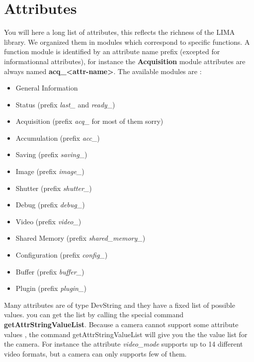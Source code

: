 \documentclass[letterpaper,10pt,english]{sphinxmanual}
\begin{document}
\section{Attributes}
\label{LimaDetector/limadetector:attributes}
You will here a long list of attributes, this reflects the richness of the LIMA library. We organized them in
modules which correspond to specific functions. A function module is identified by an attribute name prefix (excepted for informationnal attributes),
for instance the \textbf{Acquisition} module attributes  are always named \textbf{acq\_\textless{}attr-name\textgreater{}}. The available modules are :
\begin{itemize}
\item {} 
General Information

\item {} 
Status  (prefix \emph{last\_} and \emph{ready\_})

\item {} 
Acquisition (prefix \emph{acq\_} for most of them sorry)

\item {} 
Accumulation (prefix \emph{acc\_})

\item {} 
Saving  (prefix \emph{saving\_})

\item {} 
Image (prefix \emph{image\_})

\item {} 
Shutter (prefix \emph{shutter\_})

\item {} 
Debug   (prefix \emph{debug\_})

\item {} 
Video   (prefix \emph{video\_})

\item {} 
Shared Memory (prefix \emph{shared\_memory\_})

\item {} 
Configuration (prefix \emph{config\_})

\item {} 
Buffer (prefix \emph{buffer\_})

\item {} 
Plugin (prefix \emph{plugin\_})

\end{itemize}

Many attributes are of type DevString and they have a fixed list of possible values. you can get the list by calling the special command
\textbf{getAttrStringValueList}. Because a camera cannot support some attribute values , the command getAttrStringValueList will give you the
the value list for the camera. For instance the attribute \emph{video\_mode} supports up to 14 different video formats, but a camera can only supports
few of them.
\end{document}
